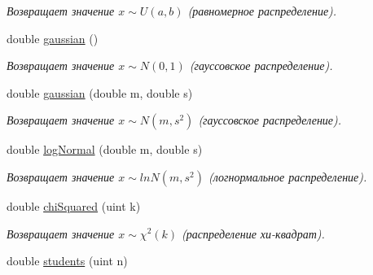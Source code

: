 \begin{DoxyCompactItemize}
\begin{DoxyCompactList}\small\item\em Возвращает значение $ x \sim U(a,b)$ (равномерное распределение). \end{DoxyCompactList}\item 
\hypertarget{namespace_math_1_1_rand_a64b32318d99ccaf50a4203419a044dd5}{}\label{namespace_math_1_1_rand_a64b32318d99ccaf50a4203419a044dd5} 
double \hyperlink{namespace_math_1_1_rand_a64b32318d99ccaf50a4203419a044dd5}{gaussian} ()
\begin{DoxyCompactList}\small\item\em Возвращает значение $ x \sim N(0,1)$ (гауссовское распределение). \end{DoxyCompactList}\item 
\hypertarget{namespace_math_1_1_rand_ae9a7ea263eab794e49f2ea3e234e1774}{}\label{namespace_math_1_1_rand_ae9a7ea263eab794e49f2ea3e234e1774} 
double \hyperlink{namespace_math_1_1_rand_ae9a7ea263eab794e49f2ea3e234e1774}{gaussian} (double m, double s)
\begin{DoxyCompactList}\small\item\em Возвращает значение $ x \sim N(m,s^2)$ (гауссовское распределение). \end{DoxyCompactList}\item 
\hypertarget{namespace_math_1_1_rand_adc86807430ed1e6cd60eb2f940f032e7}{}\label{namespace_math_1_1_rand_adc86807430ed1e6cd60eb2f940f032e7} 
double \hyperlink{namespace_math_1_1_rand_adc86807430ed1e6cd60eb2f940f032e7}{log\+Normal} (double m, double s)
\begin{DoxyCompactList}\small\item\em Возвращает значение $ x \sim lnN(m,s^2)$ (логнормальное распределение). \end{DoxyCompactList}\item 
\hypertarget{namespace_math_1_1_rand_a4c692e54ef84c65b1ac870a3d8ab35c8}{}\label{namespace_math_1_1_rand_a4c692e54ef84c65b1ac870a3d8ab35c8} 
double \hyperlink{namespace_math_1_1_rand_a4c692e54ef84c65b1ac870a3d8ab35c8}{chi\+Squared} (uint k)
\begin{DoxyCompactList}\small\item\em Возвращает значение $ x \sim \chi^2(k)$ (распределение хи-\/квадрат). \end{DoxyCompactList}\item 
\hypertarget{namespace_math_1_1_rand_a9734bfad6fcbf96582aaa3e9cf9aab02}{}\label{namespace_math_1_1_rand_a9734bfad6fcbf96582aaa3e9cf9aab02} 
double \hyperlink{namespace_math_1_1_rand_a9734bfad6fcbf96582aaa3e9cf9aab02}{students} (uint n)

\end{DoxyCompactItemize}
